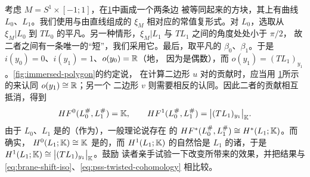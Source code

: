 \begin{example}\label{thm:cylinder-two-gon-example}
考虑 $M=S^1\times[-1;1]$，在\cref{fig:cylinder-two-gon}中画成一个两条\trVertical{}边%
被等同起来的方块，其上有曲线 $L_0$、$L_1$。我们使用与由\trHorizontal{}直线组成的%
\trFoliation{} $\xi_M$ 相对应的常值复\trVolume{}形式。对 $L_0$，选取从 $\xi_M|L_0$ 到%
$TL_0$ 的平凡\trHomotopy。另一种情形，$\xi_M|L_1$ 与 $TL_1$ 之间的角度处处小于 $\pi/2$，%
故二者之间有一条唯一的“短”\trHomotopy，我们采用它。最后，取平凡的\trLineBundle{}
$\beta_0$、$\beta_1$。于是 $i(y_0)=0$、$i(y_1)=1$、$o(y_0)=\mathbb{R}$（\trCanonical{}地，%
因为\trIndex{}是偶数），而 $o(y_1)=(TL_1)_{y_1}$。\cref{fig:immersed-polygon}的约定说，%
在计算二边形 $u$ 对\trBoundaryOperator{}的贡献时，应当用%
\cref{fig:cylinder-two-gon}所示的\trOrientation{}来认同 $o(y_1)\cong\mathbb{R}$；另一个%
二边形 $v$ 则需要相反的认同。因此二者的贡献相互抵消，得到
\begin{equation*}
HF^0(L_0^{\#},L_1^{\#})=\mathbb{K},\qquad
HF^1(L_0^{\#},L_1^{\#})=\bigl|(TL_1)_{y_1}\bigr|_{\mathbb{K}}.
\end{equation*}
由于 $L_0$、$L_1$ 是\trIsotopy{}的（作为\trExactLagrangianBrane），一般理论说存在%
\trCanonical{}的\trIsomorphism{} $HF^*(L_0^{\#},L_1^{\#})\cong H^*(L_1;\mathbb{K})$。而确实，%
$H^0(L_1;\mathbb{K})\cong\mathbb{K}$ 是\trCanonical{}的，而 $H^1(L_1;\mathbb{K})$ 的自然\trGenerator{}恰是%
$L_1$ 的诸\trOrientation，于是 $H^1(L_1;\mathbb{K})\cong\bigl|(TL_1)_{y_1}\bigr|_{\mathbb{K}}$。鼓励%
读者亲手试验一下改变\trBraneStructure{}所带来的效果，并把结果与%
\eqref{eq:brane-shift-iso}、\eqref{eq:pss-twisted-cohomology} 相比较。
\begin{figure}[htbp]
\centering
{}
\caption{}\label{fig:cylinder-two-gon}
\end{figure}
\end{example}
